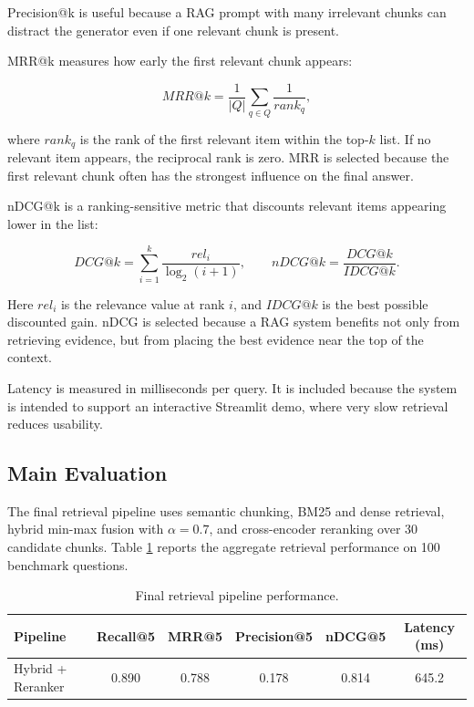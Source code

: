 \documentclass[11pt,a4paper]{article}
\begin{document}
Precision@k is useful because a RAG prompt with many irrelevant chunks can
distract the generator even if one relevant chunk is present.

MRR@k measures how early the first relevant chunk appears:

\[
    MRR@k =
    \frac{1}{|Q|}
    \sum_{q \in Q}
    \frac{1}{rank_q},
\]

where $rank_q$ is the rank of the first relevant item within the top-$k$ list.
If no relevant item appears, the reciprocal rank is zero. MRR is selected
because the first relevant chunk often has the strongest influence on the final
answer.

nDCG@k is a ranking-sensitive metric that discounts relevant items appearing
lower in the list:

\[
    DCG@k =
    \sum_{i=1}^{k}
    \frac{rel_i}{\log_2(i+1)},
    \qquad
    nDCG@k =
    \frac{DCG@k}{IDCG@k}.
\]

Here $rel_i$ is the relevance value at rank $i$, and $IDCG@k$ is the best
possible discounted gain. nDCG is selected because a RAG system benefits not
only from retrieving evidence, but from placing the best evidence near the top
of the context.

Latency is measured in milliseconds per query. It is included because the
system is intended to support an interactive Streamlit demo, where very slow
retrieval reduces usability.

\subsection{Main Evaluation}

The final retrieval pipeline uses semantic chunking, BM25 and dense retrieval,
hybrid min-max fusion with $\alpha = 0.7$, and cross-encoder reranking over 30
candidate chunks. Table \ref{tab:main-retrieval} reports the aggregate
retrieval performance on 100 benchmark questions.

\begin{table}[H]
\centering
\caption{Final retrieval pipeline performance.}
\label{tab:main-retrieval}
\begin{tabular}{lccccc}
\toprule
Pipeline & Recall@5 & MRR@5 & Precision@5 & nDCG@5 & Latency (ms) \\
\midrule
Hybrid + Reranker & 0.890 & 0.788 & 0.178 & 0.814 & 645.2 \\
\bottomrule
\end{tabular}
\end{table}
\end{document}
